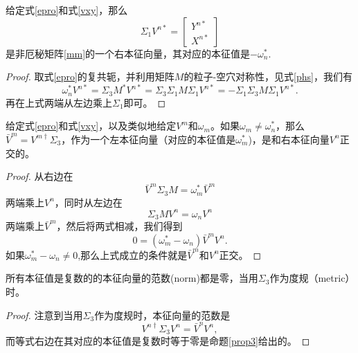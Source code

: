 \begin{proposition}\label{prop2}
    给定式\eqref{epro}和式\eqref{vxy}，那么
    \begin{equation}
  \Sigma_1 V^{n*} = \begin{bmatrix}
      Y^{n*} \\
       X^{n*}
  \end{bmatrix}
\end{equation}
是非厄秘矩阵\eqref{mm}的一个右本征向量，其对应的本征值是$-\omega_n^*$.
\end{proposition}
\begin{proof}
    取式\eqref{epro}的复共轭，并利用矩阵$M$的粒子-空穴对称性，见式\eqref{phs}，我们有
    \begin{equation}
  \omega^*_n V^{n*} = \Sigma_3 M^* V^{n*} = \Sigma_3 \Sigma_1 M \Sigma_1 V^{n*}= -\Sigma_1\Sigma_3 M \Sigma_1 V^{n*}.
\end{equation}
再在上式两端从左边乘上$\Sigma_1$即可。
\end{proof}

\begin{proposition}\label{prop3}
    给定式\eqref{epro}和式\eqref{vxy}，以及类似地给定$V^m$和$\omega_m$。如果$\omega_m\neq \omega^*_n$，那么$\bar V^m = V^{m\dagger} \Sigma_3$，作为一个左本征向量（对应的本征值是$\omega_m^*$)，是和右本征向量$V^n$正交的。
\end{proposition}

\begin{proof}
    从右边在
    \begin{equation}
  \bar V^m \Sigma_3 M = \omega_m^* \bar V^m
\end{equation}
两端乘上$V^n$，同时从左边在
\begin{equation}
  \Sigma_3 M V^n = \omega_n V^n
\end{equation}
两端乘上$\bar V^m$，然后将两式相减，我们得到
\begin{equation}
  0=(\omega^*_m - \omega_n ) \bar V^m V^n.
\end{equation}
如果$\omega^*_m - \omega_n\neq 0$,那么上式成立的条件就是$\bar V^m$和$V^n$正交。
\end{proof}
\begin{corollary}\label{coro4}
    所有本征值是复数的的本征向量的范数(norm)都是零，当用$\Sigma_3$作为度规（metric）时。
\end{corollary}
\begin{proof}
    注意到当用$\Sigma_3$作为度规时，本征向量的范数是
    \begin{equation}
  V^{n\dagger}\Sigma_3 V^n = \bar V^n V^n,
\end{equation}
而等式右边在其对应的本征值是复数时等于零是命题\ref{prop3}给出的。
\end{proof}

